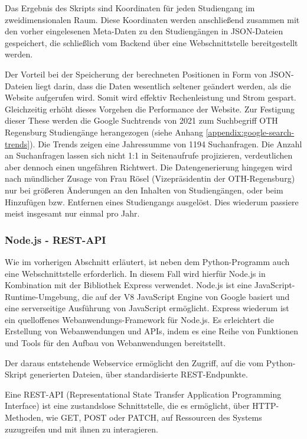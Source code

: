 Das Ergebnis des Skripts sind Koordinaten für jeden Studiengang im
zweidimensionalen Raum. Diese Koordinaten werden anschließend zusammen mit den
vorher eingelesenen Meta-Daten zu den Studiengängen in JSON-Dateien gespeichert,
die schließlich vom Backend über eine Webschnittstelle bereitgestellt werden.

Der Vorteil bei der Speicherung der berechneten Positionen in Form von
JSON-Dateien liegt darin, dass die Daten wesentlich seltener geändert werden,
als die Website aufgerufen wird. Somit wird effektiv Rechenleistung und Strom
gespart. Gleichzeitig erhöht
dieses Vorgehen die Performance der Website. Zur Festigung dieser These werden
die Google Suchtrends von 2021 zum Suchbegriff \glqq OTH Regensburg
Studiengänge\grqq{} herangezogen (siehe Anhang
\ref{appendix:google-search-trends}). Die Trends zeigen eine Jahressumme von
1194 Suchanfragen. Die Anzahl an Suchanfragen lassen sich nicht 1:1 in
Seitenaufrufe projizieren, verdeutlichen aber dennoch einen ungefähren
Richtwert. Die Datengenerierung hingegen wird nach mündlicher Zusage von
Frau Rösel (Vizepräsidentin der OTH-Regensburg) nur bei größeren Änderungen an den
Inhalten von Studiengängen, oder beim Hinzufügen bzw. Entfernen eines 
Studiengangs ausgelöst. Dies wiederum passiere meist insgesamt nur einmal pro
Jahr.

\newpage
\subsubsection{Node.js - REST-API}\label{sec:node-js-restapi}
Wie im vorherigen Abschnitt erläutert, ist neben dem Python-Programm auch eine Webschnittstelle erforderlich. In diesem Fall wird hierfür Node.js in Kombination mit der Bibliothek Express verwendet. Node.js ist eine JavaScript-Runtime-Umgebung, die auf der V8 JavaScript Engine von Google basiert und eine serverseitige Ausführung von JavaScript ermöglicht. \parencite{foundation_nodejs_2023} Express wiederum ist ein quelloffenes Webanwendungs-Framework für Node.js. Es erleichtert die Erstellung von Webanwendungen und APIs, indem es eine Reihe von Funktionen und Tools für den Aufbau von Webanwendungen bereitstellt.
\parencite{foundation_express_2023}

Der daraus entstehende Webservice ermöglicht den Zugriff, auf die vom Python-Skript generierten Dateien, über standardisierte REST-Endpunkte.

Eine REST-API (Representational State Transfer Application Programming Interface) ist eine zustandslose Schnittstelle, die es ermöglicht, über HTTP-Methoden, wie GET, POST oder PATCH, auf Ressourcen des Systems zuzugreifen und mit ihnen zu interagieren.


